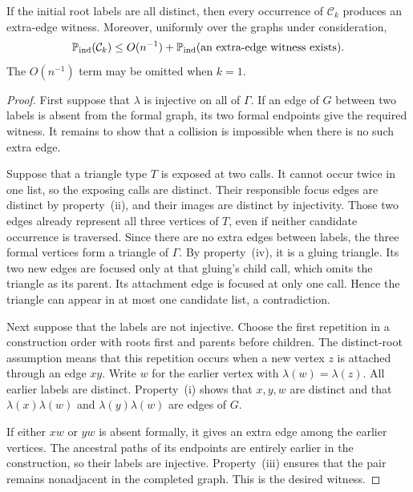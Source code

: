 \begin{lemma}
\label{lem:witness}
If the initial root labels are all distinct, then every occurrence of
$\mathcal C_k$ produces an extra-edge witness.  Moreover, uniformly
over the graphs under consideration,
\begin{equation}
\label{eq:collision-witness}
 \mathbb P_{\mathrm{ind}}(\mathcal C_k)
 \le O(n^{-1})+
 \mathbb P_{\mathrm{ind}}(\text{an extra-edge witness exists}).
\end{equation}
The $O(n^{-1})$ term may be omitted when $k=1$.
\end{lemma}

\begin{proof}
First suppose that $\lambda$ is injective on all of $\Gamma$.
If an edge of $G$ between two labels is absent from the formal graph,
its two formal endpoints give the required witness.  It remains to
show that a collision is impossible when there is no such extra edge.

Suppose that a triangle type $T$ is exposed at two calls.  It cannot
occur twice in one list, so the exposing calls are distinct.  Their
responsible focus edges are distinct by property~(ii), and their
images are distinct by injectivity.  Those two edges already represent
all three vertices of $T$, even if neither candidate occurrence is
traversed.  Since there are no extra edges between labels, the three
formal vertices form a triangle of $\Gamma$.  By property~(iv), it is
a gluing triangle.  Its two new edges are focused only at that
gluing's child call, which omits the triangle as its parent.  Its
attachment edge is focused at only one call.  Hence the triangle can
appear in at most one candidate list, a contradiction.

Next suppose that the labels are not injective.  Choose the first
repetition in a construction order with roots first and parents
before children.  The distinct-root assumption means that this
repetition occurs when a new vertex $z$ is attached through an edge
$xy$.  Write $w$ for the earlier vertex with $\lambda(w)=\lambda(z)$.
All earlier labels are distinct.  Property~(i) shows that $x,y,w$ are
distinct and that $\lambda(x)\lambda(w)$ and
$\lambda(y)\lambda(w)$ are edges of $G$.

If either $xw$ or $yw$ is absent formally, it gives an extra edge
among the earlier vertices.  The ancestral paths of its endpoints
are entirely earlier in the construction, so their labels are
injective.  Property~(iii) ensures that the pair remains nonadjacent
in the completed graph.  This is the desired witness.


\end{proof}
